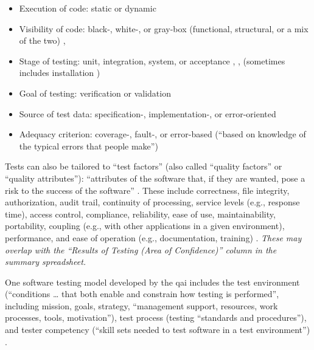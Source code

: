 \begin{itemize}
      \item Execution of code: static or dynamic
            \cite[p.~53]{patton_software_2006}
      \item Visibility of code: black-, white-, or gray-box (functional,
            structural, or a mix of the two)
            \cite[pp.~53, 218]{patton_software_2006}, \cite[p.~69]{perry_effective_2006}
      \item Stage of testing: unit, integration, system, or acceptance
            \cite{patton_software_2006}, \cite{perry_effective_2006},
            \cite{peters_software_2000} (sometimes includes installation
            \cite[p.~439]{van_vliet_software_2000})
      \item Goal of testing: verification or validation
            \cite[pp.~69-70]{perry_effective_2006}
      \item Source of test data: specification-, implementation-, or
            error-oriented \cite[p.~440]{peters_software_2000}
      \item Adequacy criterion: coverage-, fault-, or error-based
            (``based on knowledge of the typical errors that people make'')
            \cite[pp.~398-399]{van_vliet_software_2000}
\end{itemize}

Tests can also be tailored to ``test factors'' (also called ``quality factors''
or ``quality attributes''): ``attributes of the software that, if they are
wanted, pose a risk to the success of the software''
\cite[p.~40]{perry_effective_2006}. These include correctness, file integrity,
authorization, audit trail, continuity of processing, service levels
(e.g., response time), access control, compliance, reliability, ease of use,
maintainability, portability, coupling (e.g., with other applications in a
given environment), performance, and ease of operation (e.g., documentation,
training) \cite[pp.~40-41]{perry_effective_2006}. \emph{These may overlap with
the ``Results of Testing (Area of Confidence)'' column in the summary
spreadsheet.}

One software testing model developed by the \acf{qai} includes the test
environment (``conditions \dots
that both enable and constrain how testing is performed'', including mission,
goals, strategy, ``management support, resources, work processes, tools,
motivation''), test process (testing ``standards and procedures''), and tester
competency (``skill sets needed to test software in a test environment'')
\cite[pp.~5-6]{perry_effective_2006}.

